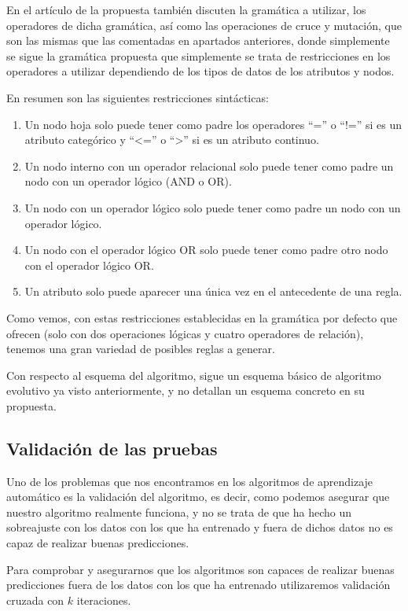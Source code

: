 En el artículo de la propuesta también discuten la gramática a utilizar, los operadores de dicha gramática, así como las operaciones de cruce y mutación, que son las mismas que las comentadas en apartados anteriores, donde simplemente se sigue la gramática propuesta que simplemente se trata de restricciones en los operadores a utilizar dependiendo de los tipos de datos de los atributos y nodos.

En resumen son las siguientes restricciones sintácticas:

\begin{enumerate}
	\item Un nodo hoja solo puede tener como padre los operadores ``='' o ``!='' si es un atributo categórico y ``<='' o ``>'' si es un atributo continuo.
	\item Un nodo interno con un operador relacional solo puede tener como padre un nodo con un operador lógico (AND o OR).
	\item Un nodo con un operador lógico solo puede tener como padre un nodo con un operador lógico.
	\item Un nodo con el operador lógico OR solo puede tener como padre otro nodo con el operador lógico OR.
	\item Un atributo solo puede aparecer una única vez en el antecedente de una regla.
\end{enumerate}

Como vemos, con estas restricciones establecidas en la gramática por defecto que ofrecen (solo con dos operaciones lógicas y cuatro operadores de relación), tenemos una gran variedad de posibles reglas a generar.

Con respecto al esquema del algoritmo, sigue un esquema básico de algoritmo evolutivo ya visto anteriormente, y no detallan un esquema concreto en su propuesta.

\newpage

\subsection{Validación de las pruebas}


Uno de los problemas que nos encontramos en los algoritmos de aprendizaje automático es la validación del algoritmo, es decir, como podemos asegurar que nuestro algoritmo realmente funciona, y no se trata de que ha hecho un sobreajuste con los datos con los que ha entrenado y fuera de dichos datos no es capaz de realizar buenas predicciones.

Para comprobar y asegurarnos que los algoritmos son capaces de realizar buenas predicciones fuera de los datos con los que ha entrenado utilizaremos validación cruzada con $k$ iteraciones.

